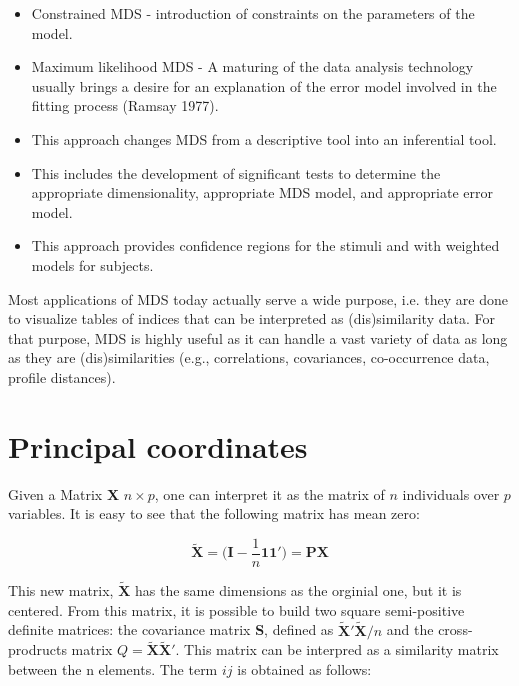 \documentclass[11pt]{report}
\begin{document}
\begin{itemize}
\item Constrained MDS - introduction of constraints on the parameters 
of the  model. 

\item Maximum likelihood MDS - A maturing of the data analysis technology 
usually brings a desire for an explanation of the error model involved in 
the fitting process (Ramsay 1977). 

\item This approach changes MDS from a descriptive tool into an inferential 
tool. 

\item This includes the development of significant tests to determine the 
appropriate dimensionality, appropriate MDS model, and appropriate 
error model. 

\item This approach provides confidence regions for the stimuli and with 
weighted models for subjects.         
\end{itemize}

\indent Most applications of MDS today actually serve a wide purpose, i.e. they 
are done to visualize tables of indices that can be interpreted as 
(dis)similarity data. For that purpose, MDS is highly useful as it can handle a 
vast variety of data as long as they are (dis)similarities 
(e.g., correlations, covariances, co-occurrence data, profile distances).

\section{Principal coordinates}
Given a Matrix \textbf{X} $n \times p$, one can interpret it as the matrix of $n$ 
individuals over $p$ variables. It is easy to see that the following matrix
has mean zero:

$$\mathbf{\widetilde{X}} = \Big( \mathbf{I} - \frac{1}{n} \mathbf{1}\mathbf{1'}\Big) = \mathbf{P}\mathbf{X}$$

This new matrix, $\mathbf{\widetilde{X}}$ has the same dimensions as the orginial one, but
it is centered. From this matrix, it is possible to build two square semi-positive
definite matrices: the covariance matrix \textbf{S}, defined as 
$\mathbf{\widetilde{X}'}\mathbf{\widetilde{X}}/n$ and the cross-prodructs matrix 
$Q = \mathbf{\widetilde{X}}\mathbf{\widetilde{X}'}$. This matrix can be interpred as a similarity 
matrix between the n elements. The term $ij$ is obtained as follows:
\end{document}
